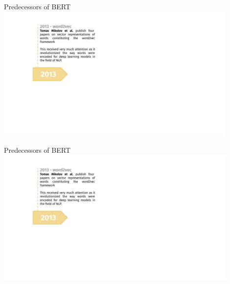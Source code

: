 \begin{vbframe}{Predecessors of BERT}
\hbox{\hspace{-3em} \includegraphics[width=12cm,page=4]{figure/transfer_learning_timeline1_nlp.pdf}}
\end{vbframe}
\begin{vbframe}{Predecessors of BERT}
\hbox{\hspace{-3em} \includegraphics[width=12cm,page=5]{figure/transfer_learning_timeline1_nlp.pdf}}
\end{vbframe}


